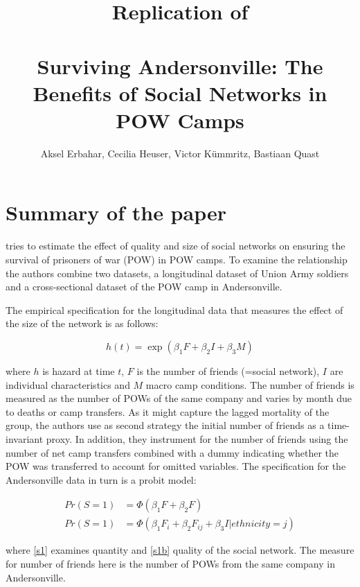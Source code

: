 \documentclass{article}
\title{Replication of\\~\\Surviving Andersonville: The Benefits of Social Networks in POW Camps}
\author{Aksel Erbahar, Cecilia Heuser, Victor K\"ummritz, Bastiaan Quast}
\begin{document}
\maketitle
{}

\newpage

\tableofcontents
\newpage
\listoftables
\listoffigures
\newpage

\section{Summary of the paper}
\textcite{costa2007surviving} tries to estimate the effect of quality and size of social networks on ensuring the survival of prisoners of war (POW) in POW camps. To examine the relationship the authors combine two datasets, a longitudinal dataset of Union Army soldiers and a cross-sectional dataset of the POW camp in Andersonville. 

The empirical specification for the longitudinal data that measures the effect of the size of the network is as follows:

\begin{equation} \label{eq:ht}
h(t) = \exp ( \beta_1 F + \beta_2 I + \beta_3 M )
\end{equation}

where $h$ is hazard at time $t$, $F$ is the number of friends (=social network), $I$ are individual characteristics and $M$ macro camp conditions. The number of friends is measured as the number of POWs of the same company and varies by month due to deaths or camp transfers. As it might capture the lagged mortality of the group, the authors use as second strategy the initial number of friends as a time-invariant proxy. In addition, they instrument for the number of friends using the number of net camp transfers combined with a dummy indicating whether the POW was transferred to account for omitted variables. 
The specification for the Andersonville data in turn is a probit model:

\begin{align}
\label{s1} Pr(S = 1) &= \Phi (\beta_1 F + \beta_2 F)\\
\label{s1b} Pr(S = 1) &= \Phi (\beta_1 F_i + \beta_2 F_{ij} + \beta_3 I | ethnicity = j)
\end{align}

where \autoref{s1} examines quantity and \autoref{s1b} quality of the social network. The measure for number of friends here is the number of POWs from the same company in Andersonville.
\end{document}
